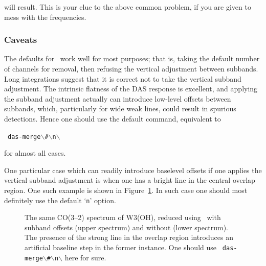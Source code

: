 will result. This is your clue to the above common problem, if you
are given to mess with the frequencies.

\subsubsection{Caveats}
The defaults for \dm\ work well for most purposes; that is, taking the
default number of channels for removal, then refusing the vertical
adjustment between subbands. Long integrations suggest that it
is correct not to take the vertical subband adjustment.  The intrinsic
flatness of the DAS response is excellent, and applying the subband
adjustment actually can introduce low-level offsets between subbands,
which, particularly for wide weak lines, could result in spurious
detections.  Hence one should use the default command, equivalent to

\SP\ {\tt das-merge$\backslash$\#$\backslash$n$\backslash$} 

for almost all cases. 

One particular case which can readily introduce baselevel offsets if one
applies the vertical subband adjustment is when one has a bright line
in the central overlap region. One such example is shown in
Figure~\ref{fig:dasmerge_yn}. In such case one should most definitely
use the default `{\tt{n}}' option.
%
\begin{figure}[ht]
\centering
\leavevmode
\epsfxsize=4.0in
\vspace*{-0.5cm}
\begin{center}
\begin{minipage}[t]{5in}
\caption[\dm ; yes or no]
{\small{The same CO(3--2) spectrum of W3(OH), reduced using \dm\ with
subband offsets (upper spectrum) and without (lower spectrum). The
presence of the strong line in the overlap region introduces an
artificial baseline step in the former instance. One should use {\tt
das-merge$\backslash$\#$\backslash$n$\backslash$} here for sure.  }}
\label{fig:dasmerge_yn}
\end{minipage}
\end{center}
\end{figure}
%


